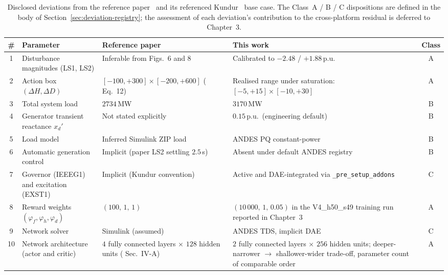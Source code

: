 \documentclass{unnc-fyp}
\begin{document}
\begin{table}[tb]
  \centering
  \small
  \caption{Disclosed deviations from the reference
           paper~\cite{yang2023ddic} and its referenced
           Kundur~\cite{kundur1994power} base case. The
           Class~A / B / C dispositions are defined in the body of
           Section~\ref{sec:deviation-registry}; the
           assessment of each deviation's contribution to the
           cross-platform residual is deferred to Chapter~3.}
  \label{tab:deviations}
  \begin{tabular}{@{}cp{3.0cm}p{3.5cm}p{3.5cm}c@{}}
    \toprule
    \# & Parameter & Reference paper & This work & Class \\
    \midrule
    1 & Disturbance magnitudes (LS1, LS2)
      & Inferable from \cite{yang2023ddic} Figs.~6 and 8
      & Calibrated to $-2.48$ / $+1.88$\,p.u.
      & A \\
    2 & Action box $(\Delta H, \Delta D)$
      & $[-100, +300] \times [-200, +600]$
        (\cite{yang2023ddic} Eq.~12)
      & Realised range under saturation:
        $[-5, +15] \times [-10, +30]$
      & A \\
    3 & Total system load
      & $2734$\,MW
      & $3170$\,MW
      & B \\
    4 & Generator transient reactance $x_d'$
      & Not stated explicitly
      & $0.15$\,p.u.\ (engineering default)
      & B \\
    5 & Load model
      & Inferred Simulink ZIP load
      & ANDES PQ constant-power
      & B \\
    6 & Automatic generation control
      & Implicit (paper LS2 settling $2.5$\,s)
      & Absent under default ANDES registry
      & B \\
    7 & Governor (IEEEG1) and excitation (EXST1)
      & Implicit (Kundur convention)
      & Active and DAE-integrated via
        \verb|_pre_setup_addons|
      & C \\
    8 & Reward weights
        $(\varphi_{f}, \varphi_{h}, \varphi_{d})$
      & $(100,\, 1,\, 1)$
      & $(10\,000,\, 1,\, 0.05)$ in the V4\_h50\_s49 training run
        reported in Chapter~3
      & A \\
    9 & Network solver
      & Simulink (assumed)
      & ANDES TDS, implicit DAE
      & C \\
    10 & Network architecture (actor and critic)
      & $4$ fully connected layers $\times$ $128$ hidden units
        (\cite{yang2023ddic} Sec.~IV-A)
      & $2$ fully connected layers $\times$ $256$ hidden units;
        deeper-narrower $\to$ shallower-wider trade-off, parameter
        count of comparable order
      & A \\
    \bottomrule
  \end{tabular}
\end{table}
\end{document}
